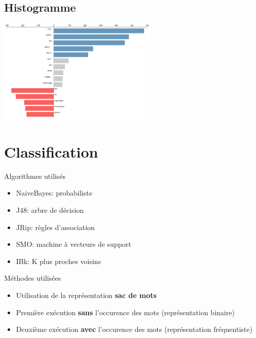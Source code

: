 \documentclass{beamer}
\begin{document}
\subsection{Histogramme}
\begin{frame}
	\includegraphics[height=5cm]{imgs/visu2.png}
\end{frame}

\section{Classification}

\begin{frame}
	\begin{block}{Algorithmes utilisés}
		\begin{itemize}
			\item NaiveBayes: probabiliste
			\item J48: arbre de décision
			\item JRip: règles d'association
			\item SMO: machine à vecteurs de support
			\item IBk: K plus proches voisins
		\end{itemize}
	\end{block}
\end{frame}

\begin{frame}
	\begin{block}{Méthodes utilisées}
		\begin{itemize}
			\item Utilisation de la représentation \textbf{sac de mots}
			\item Première exécution \textbf{sans} l'occurence des mots (représentation binaire)
			\item Deuxième exécution \textbf{avec} l'occurence des mots (représentation fréquentiste)
		\end{itemize}
	\end{block}
\end{frame}
\end{document}
